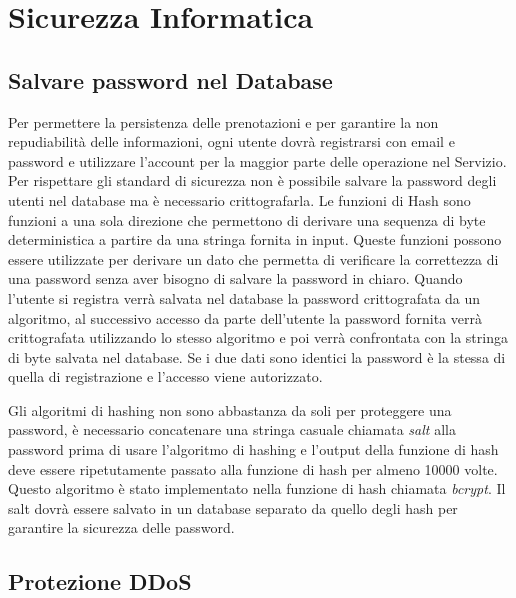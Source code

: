 \section{Sicurezza Informatica}

\subsection{Salvare password nel Database}%
\label{sub:password}

Per permettere la persistenza delle prenotazioni e per garantire la non repudiabilit\`a delle informazioni, ogni utente dovr\`a registrarsi con email e password e utilizzare l'account per la maggior parte delle operazione nel Servizio. Per rispettare gli standard di sicurezza non \`e possibile salvare la password degli utenti nel database ma \`e necessario crittografarla. Le funzioni di Hash sono funzioni a una sola direzione che permettono di derivare una sequenza di byte deterministica a partire da una stringa fornita in input. Queste funzioni possono essere utilizzate per derivare un dato che permetta di verificare la correttezza di una password senza aver bisogno di salvare la password in chiaro. Quando l'utente si registra verr\`a salvata nel database la password crittografata da un algoritmo, al successivo accesso da parte dell'utente la password fornita verr\`a crittografata utilizzando lo stesso algoritmo e poi verr\`a confrontata con la stringa di byte salvata nel database. Se i due dati sono identici la password \`e la stessa di quella di registrazione e l'accesso viene autorizzato.

Gli algoritmi di hashing non sono abbastanza da soli per proteggere una password, \`e necessario concatenare una stringa casuale chiamata \emph{salt} alla password prima di usare l'algoritmo di hashing e l'output della funzione di hash deve essere ripetutamente passato alla funzione di hash per almeno 10000 volte. Questo algoritmo \`e stato implementato nella funzione di hash chiamata \emph{bcrypt}. Il salt dovr\`a essere salvato in un database separato da quello degli hash per garantire la sicurezza delle password.


\subsection{Protezione DDoS}%
\label{sub:pretezione_ddos}

